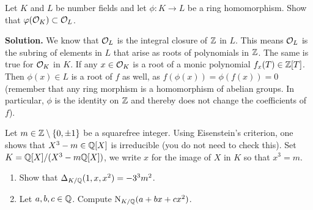 \documentclass[a4paper,11pt]{article}
\begin{document}
Let $K$ and $L$ be number fields and let $\phi: K \to L$ be a ring homomorphism.
Show that $\varphi(\mathcal{O}_K) \subset \mathcal{O}_L$.

\textbf{Solution.} We know that $\mathcal{O}_L$ is the integral closure of $\mathbb{Z}$ in $L$. This
means $\mathcal{O}_L$ is the subring of elements in $L$ that arise as roots of polynomials
in $\mathbb{Z}$. The same is true for $\mathcal{O}_K$ in $K$. If any $x \in \mathcal{O}_K$ is a root of a
monic polynomial $f_x(T) \in \mathbb{Z}[T]$. Then $\phi(x) \in L$ is a root of $f$ as well,
as $f(\phi(x)) = \phi(f(x)) = 0$ (remember that any ring morphism is a
homomorphism of abelian groups. In particular, $\phi$ is the identity
on $\mathbb{Z}$ and thereby does not change the coefficients of $f$).

Let $m \in \mathbb{Z} \setminus \{0, \pm 1\}$ be a squarefree integer. Using Eisenstein's
criterion, one shows that $X^3 -m \in \mathbb{Q}[X]$ is irreducible (you do not need to check
this). Set $K = \mathbb{Q}[X]/(X^3-m \mathbb{Q}[X])$, we write $x$ for the image of $X$ in $K$
so that $x^3 = m$. 
\begin{enumerate}
    \item Show that $\Delta_{K/\mathbb{Q}}(1,x,x^2) = -3^3 m^2$.
    \item Let $a,b,c \in \mathbb{Q}$. Compute $\operatorname{N}_{K/\mathbb{Q}}(a + bx + cx^2)$.
\end{enumerate}
\end{document}
